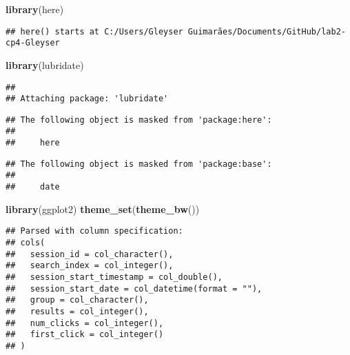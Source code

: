 \documentclass[]{article}
\newenvironment{Shaded}{\begin{snugshade}}{\end{snugshade}}
\newcommand{\KeywordTok}[1]{\textcolor[rgb]{0.13,0.29,0.53}{\textbf{#1}}}
\newcommand{\DataTypeTok}[1]{\textcolor[rgb]{0.13,0.29,0.53}{#1}}
\newcommand{\StringTok}[1]{\textcolor[rgb]{0.31,0.60,0.02}{#1}}
\newcommand{\OperatorTok}[1]{\textcolor[rgb]{0.81,0.36,0.00}{\textbf{#1}}}
\newcommand{\NormalTok}[1]{#1}
\begin{document}
\begin{Shaded}
\begin{Highlighting}[]
\KeywordTok{library}\NormalTok{(here)}
\end{Highlighting}
\end{Shaded}

\begin{verbatim}
## here() starts at C:/Users/Gleyser Guimarães/Documents/GitHub/lab2-cp4-Gleyser
\end{verbatim}

\begin{Shaded}
\begin{Highlighting}[]
\KeywordTok{library}\NormalTok{(lubridate)}
\end{Highlighting}
\end{Shaded}

\begin{verbatim}
## 
## Attaching package: 'lubridate'
\end{verbatim}

\begin{verbatim}
## The following object is masked from 'package:here':
## 
##     here
\end{verbatim}

\begin{verbatim}
## The following object is masked from 'package:base':
## 
##     date
\end{verbatim}

\begin{Shaded}
\begin{Highlighting}[]
\KeywordTok{library}\NormalTok{(ggplot2)}
\KeywordTok{theme_set}\NormalTok{(}\KeywordTok{theme_bw}\NormalTok{())}
\end{Highlighting}
\end{Shaded}

\begin{Shaded}
\end{Shaded}

\begin{verbatim}
## Parsed with column specification:
## cols(
##   session_id = col_character(),
##   search_index = col_integer(),
##   session_start_timestamp = col_double(),
##   session_start_date = col_datetime(format = ""),
##   group = col_character(),
##   results = col_integer(),
##   num_clicks = col_integer(),
##   first_click = col_integer()
## )
\end{verbatim}
\end{document}
